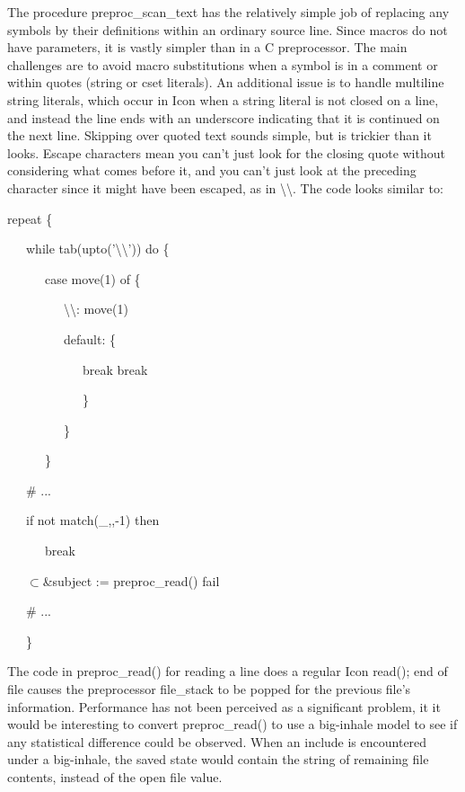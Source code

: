 The procedure preproc\_scan\_text has the relatively simple job of
replacing any symbols by their definitions within an ordinary source
line. Since macros do not have parameters, it is vastly simpler than
in a C preprocessor. The main challenges are to avoid macro
substitutions when a symbol is in a comment or within quotes (string
or cset literals).  An additional issue is to handle multiline string
literals, which occur in Icon when a string literal is not closed on a
line, and instead the line ends with an underscore indicating that it
is continued on the next line. Skipping over quoted text sounds
simple, but is trickier than it looks. Escape characters mean you
can't just look for the closing quote without considering what comes
before it, and you can't just look at the preceding character since it
might have been escaped, as in
{\textquotedbl}{\textbackslash}{\textbackslash}{\textquotedbl}. The
code looks similar to:

{\ttfamily\mdseries
repeat \{}

{\ttfamily\mdseries
\ \ \ while tab(upto('{\textquotedbl}{\textbackslash}{\textbackslash}')) do \{}

{\ttfamily\mdseries
\ \ \ \ \ \ case move(1) of \{}

{\ttfamily\mdseries
\ \ \ \ \ \ \ \ \ {\textquotedbl}{\textbackslash}{\textbackslash}{\textquotedbl}: move(1)}

{\ttfamily\mdseries
\ \ \ \ \ \ \ \ \ default: \{}

{\ttfamily\mdseries
\ \ \ \ \ \ \ \ \ \ \ \ break break}

{\ttfamily\mdseries
\ \ \ \ \ \ \ \ \ \ \ \ \}}

{\ttfamily\mdseries
\ \ \ \ \ \ \ \ \ \}}

{\ttfamily\mdseries
\ \ \ \ \ \ \}}

{\ttfamily\mdseries
\ \ \ \# ...}

{\ttfamily\mdseries
\ \ \ if not match({\textquotedbl}\_{\textquotedbl},,-1) then}

{\ttfamily\mdseries
\ \ \ \ \ \ break}

{\ttfamily\mdseries
\ \ \ ${\subset}$\&subject := preproc\_read() {\textbar} fail}

{\ttfamily\mdseries
\ \ \ \# ...}

{\ttfamily\mdseries
\ \ \ \}}

The code in preproc\_read() for reading a line does a regular Icon
read(); end of file causes the preprocessor file\_stack to be popped
for the previous file's information. Performance has not been
perceived as a significant problem, it it would be interesting to
convert preproc\_read() to use a big-inhale model to see if any
statistical difference could be observed. When an include is
encountered under a big-inhale, the saved state would contain the
string of remaining file contents, instead of the open file value.


